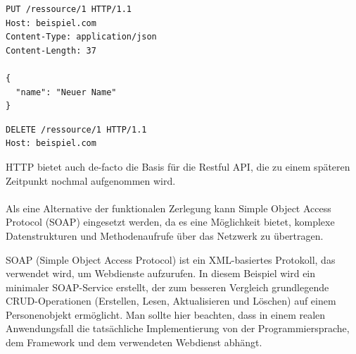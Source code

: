 \noindent\begin{minipage}{\textwidth}
\begin{lstlisting}[caption={Ressource updaten (Put)},captionpos=b,label={lst:put}]
PUT /ressource/1 HTTP/1.1
Host: beispiel.com
Content-Type: application/json
Content-Length: 37

{
  "name": "Neuer Name"
}

\end{lstlisting}
\end{minipage}

\noindent\begin{minipage}{\textwidth}
\begin{lstlisting}[caption={Ressource löschen (delete)},captionpos=b,label={lst:put}]
DELETE /ressource/1 HTTP/1.1
Host: beispiel.com
\end{lstlisting}
\end{minipage}
HTTP bietet auch de-facto die Basis für die Restful API, die zu einem späteren Zeitpunkt nochmal aufgenommen wird. 
\\\\
Als eine Alternative der funktionalen Zerlegung kann Simple Object Access Protocol (SOAP) eingesetzt werden, da es eine Möglichkeit bietet, komplexe Datenstrukturen und Methodenaufrufe über das Netzwerk zu übertragen.

SOAP (Simple Object Access Protocol) ist ein XML-basiertes Protokoll, das verwendet wird, um Webdienste aufzurufen. In diesem Beispiel wird ein minimaler SOAP-Service erstellt, der zum besseren Vergleich grundlegende CRUD-Operationen (Erstellen, Lesen, Aktualisieren und Löschen) auf einem Personenobjekt ermöglicht. Man sollte hier beachten, dass in einem realen Anwendungsfall die tatsächliche Implementierung von der Programmiersprache, dem Framework und dem verwendeten Webdienst abhängt.

